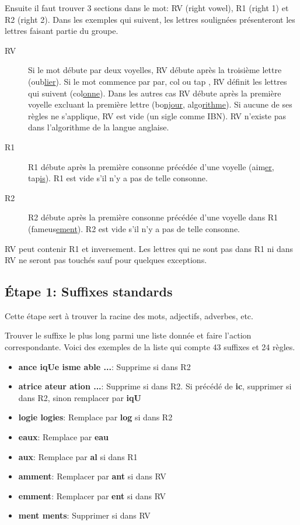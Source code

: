 Ensuite il faut trouver 3 sections dans le mot: RV (right vowel), R1 (right 1) et R2 (right 2).
Dans les exemples qui suivent, les lettres soulignées présenteront les lettres faisant partie du groupe.

\begin{description}
  \item[RV]
  
  Si le mot débute par deux voyelles, RV débute après la troisième lettre (oub\underline{lier}).
  Si le mot commence par \og par, col ou tap \fg{}, RV définit les lettres qui suivent (col\underline{onne}).
  Dans les autres cas RV débute après la première voyelle excluant la première lettre (bo\underline{njour}, algo\underline{rithme}).
  Si aucune de ses règles ne s'applique, RV est vide (un sigle comme IBN).
  RV n'existe pas dans l'algorithme de la langue anglaise.
  
  \item[R1]
  
  R1 débute après la première consonne précédée d'une voyelle (aim\underline{er}, tap\underline{is}).
  R1 est vide s'il n'y a pas de telle consonne.
  
  \item[R2]
  
  R2 débute après la première consonne précédée d'une voyelle dans R1 (fameus\underline{ement}).
  R2 est vide s'il n'y a pas de telle consonne.
\end{description}

RV peut contenir R1 et inversement.
Les lettres qui ne sont pas dans R1 ni dans RV ne seront pas touchés sauf pour quelques exceptions.

\subsection*{Étape 1: Suffixes standards}

Cette étape sert à trouver la racine des mots, adjectifs, adverbes, etc.

Trouver le suffixe le plus long parmi une liste donnée et faire l'action correspondante.
Voici des exemples de la liste qui compte 43 suffixes et 24 règles.

\begin{itemize}
  \item \textbf{ance iqUe isme able ...}: Supprime si dans R2
  \item \textbf{atrice ateur ation ...}: Supprime si dans R2. Si précédé de \textbf{ic}, supprimer si dans R2, sinon remplacer par \textbf{iqU}
  \item \textbf{logie logies}: Remplace par \textbf{log} si dans R2
  \item \textbf{eaux}: Remplace par \textbf{eau}
  \item \textbf{aux}: Remplace par \textbf{al} si dans R1
  \item \textbf{amment}: Remplacer par \textbf{ant} si dans RV
  \item \textbf{emment}: Remplacer par \textbf{ent} si dans RV
  \item \textbf{ment ments}: Supprimer si dans RV
\end{itemize}

